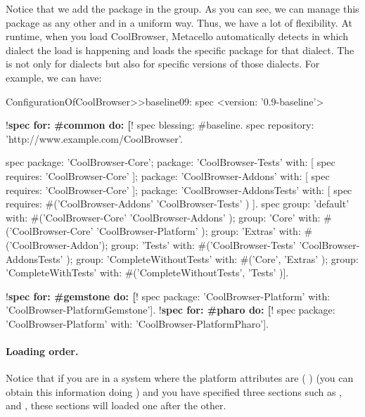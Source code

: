 \documentclass[a4paper,10pt,twoside]{book}
\begin{document}
Notice that we add the package  in the  group. As you can see, we can manage this package as any other and in a uniform way. Thus, we have a lot of flexibility. At runtime, when you load CoolBrowser, Metacello automatically detects in which dialect the load is happening and loads the specific package for that dialect. The  is not only for dialects but also for specific versions of those dialects. For example, we can have:

\begin{code}{}
ConfigurationOfCoolBrowser>>baseline09: spec
      <version: '0.9-baseline'>

      !\textbf{spec for: \#common do: [}!
            spec blessing: #baseline.
            spec repository: 'http://www.example.com/CoolBrowser'.

            spec
                  package: 'CoolBrowser-Core';
                  package: 'CoolBrowser-Tests' with: [ spec requires: 'CoolBrowser-Core' ];
                  package: 'CoolBrowser-Addons' with: [ spec requires: 'CoolBrowser-Core' ];
                  package: 'CoolBrowser-AddonsTests' with: [
                        spec requires: #('CoolBrowser-Addons' 'CoolBrowser-Tests' ) ].
            spec
                  group: 'default' with: #('CoolBrowser-Core' 'CoolBrowser-Addons' );
                  group: 'Core' with: #('CoolBrowser-Core' 'CoolBrowser-Platform' );
                  group: 'Extras' with: #('CoolBrowser-Addon');
                  group: 'Tests' with: #('CoolBrowser-Tests' 'CoolBrowser-AddonsTests' );
                  group: 'CompleteWithoutTests' with: #('Core', 'Extras' );
                  group: 'CompleteWithTests' with: #('CompleteWithoutTests', 'Tests' )].

      !\textbf{spec for: \#gemstone do: [}!
            spec package: 'CoolBrowser-Platform' with: 'CoolBrowser-PlatformGemstone'].
      !\textbf{spec for: \#pharo do: [}!
            spec package: 'CoolBrowser-Platform' with: 'CoolBrowser-PlatformPharo'].
\end{code}



\paragraph{Loading order.}
Notice that if you are
in a system where the platform attributes are (    ) (you can obtain this information doing ) and you have specified three sections such as ,  and , these sections will loaded one after the other.
\end{document}
